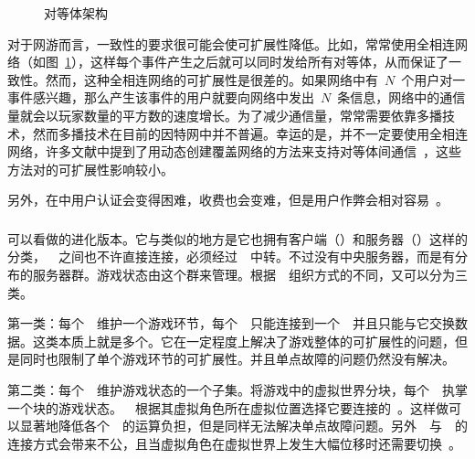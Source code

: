 \begin{figure}[htbp]
\begin{center}
\caption{对等体架构}
\label{P2P}
\end{center}
\end{figure}


对于{\pa}网游而言，一致性的要求很可能会使可扩展性降低。比如，{\pa}常常使用全相连网络（如图~\ref{P2P}），这样每个事件产生之后就可以同时发给所有对等体，从而保证了一致性。然而，这种全相连网络的可扩展性是很差的。如果网络中有~$N$~个用户对一事件感兴趣，那么产生该事件的用户就要向网络中发出~$N$~条信息，网络中的通信量就会以玩家数量的平方数的速度增长。为了减少通信量，{\pa}常常需要依靠多播技术，然而多播技术在目前的因特网中并不普遍。幸运的是，{\pa}并不一定要使用全相连网络，许多文献中提到了用动态创建覆盖网络的方法来支持对等体间通信~\cite{p2p1, p2p2}，这些方法对{\pa}的可扩展性影响较小。

另外，在{\pa}中用户认证会变得困难，收费也会变难，但是用户作弊会相对容易~\cite{Scheating}。

\subsubsection{\da}

{\da}可以看做{\csa}的进化版本。它与{\csa}类似的地方是它也拥有客户端（\ioc）和服务器（\gss）这样的分类，~\ioc~之间也不许直接连接，必须经过~\gss~中转。不过{\da}没有中央服务器，而是有分布的服务器群。游戏状态由这个群来管理。根据~\gss~组织方式的不同，{\da}又可以分为三类。

第一类：每个~\gss~维护一个游戏环节，每个~\ioc~只能连接到一个~\gss~并且只能与它交换数据。这类{\da}本质上就是多个{\csa}。它在一定程度上解决了游戏整体的可扩展性的问题，但是同时也限制了单个游戏环节的可扩展性。并且单点故障的问题仍然没有解决。

第二类：每个~\gss~维护游戏状态的一个子集。将游戏中的虚拟世界分块，每个~\gss~执掌一个块的游戏状态。~\ioc~根据其虚拟角色所在虚拟位置选择它要连接的~\gss。这样做可以显著地降低各个~\gss~的运算负担，但是同样无法解决单点故障问题。另外~\ioc~与~\gss~的连接方式会带来不公，且当虚拟角色在虚拟世界上发生大幅位移时还需要切换~\gss。

